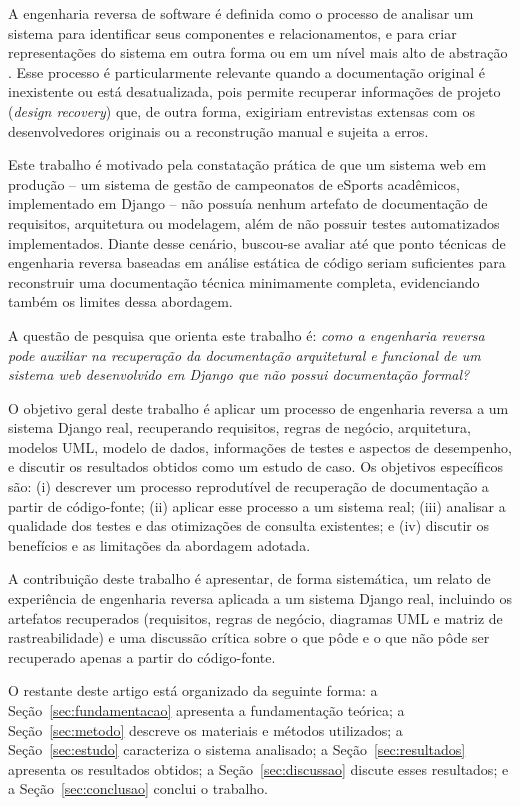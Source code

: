 \documentclass[12pt]{article}
\begin{document}
A engenharia reversa de software é definida como o processo de analisar um
sistema para identificar seus componentes e relacionamentos, e para criar
representações do sistema em outra forma ou em um nível mais alto de
abstração \cite{chikofsky1990}. Esse processo é particularmente relevante
quando a documentação original é inexistente ou está desatualizada, pois
permite recuperar informações de projeto (\emph{design recovery}) que, de
outra forma, exigiriam entrevistas extensas com os desenvolvedores originais
ou a reconstrução manual e sujeita a erros.

Este trabalho é motivado pela constatação prática de que um sistema web em
produção -- um sistema de gestão de campeonatos de eSports acadêmicos,
implementado em Django -- não possuía nenhum artefato de documentação de
requisitos, arquitetura ou modelagem, além de não possuir testes
automatizados implementados. Diante desse cenário, buscou-se avaliar até que
ponto técnicas de engenharia reversa baseadas em análise estática de código
seriam suficientes para reconstruir uma documentação técnica minimamente
completa, evidenciando também os limites dessa abordagem.

A questão de pesquisa que orienta este trabalho é: \emph{como a engenharia
reversa pode auxiliar na recuperação da documentação arquitetural e
funcional de um sistema web desenvolvido em Django que não possui
documentação formal?}

O objetivo geral deste trabalho é aplicar um processo de engenharia reversa
a um sistema Django real, recuperando requisitos, regras de negócio,
arquitetura, modelos UML, modelo de dados, informações de testes e aspectos
de desempenho, e discutir os resultados obtidos como um estudo de caso. Os
objetivos específicos são: (i) descrever um processo reprodutível de
recuperação de documentação a partir de código-fonte; (ii) aplicar esse
processo a um sistema real; (iii) analisar a qualidade dos testes e das
otimizações de consulta existentes; e (iv) discutir os benefícios e as
limitações da abordagem adotada.

A contribuição deste trabalho é apresentar, de forma sistemática, um relato
de experiência de engenharia reversa aplicada a um sistema Django real,
incluindo os artefatos recuperados (requisitos, regras de negócio, diagramas
UML e matriz de rastreabilidade) e uma discussão crítica sobre o que pôde e o
que não pôde ser recuperado apenas a partir do código-fonte.

O restante deste artigo está organizado da seguinte forma: a
Seção~\ref{sec:fundamentacao} apresenta a fundamentação teórica; a
Seção~\ref{sec:metodo} descreve os materiais e métodos utilizados; a
Seção~\ref{sec:estudo} caracteriza o sistema analisado; a
Seção~\ref{sec:resultados} apresenta os resultados obtidos; a
Seção~\ref{sec:discussao} discute esses resultados; e a
Seção~\ref{sec:conclusao} conclui o trabalho.
\end{document}
